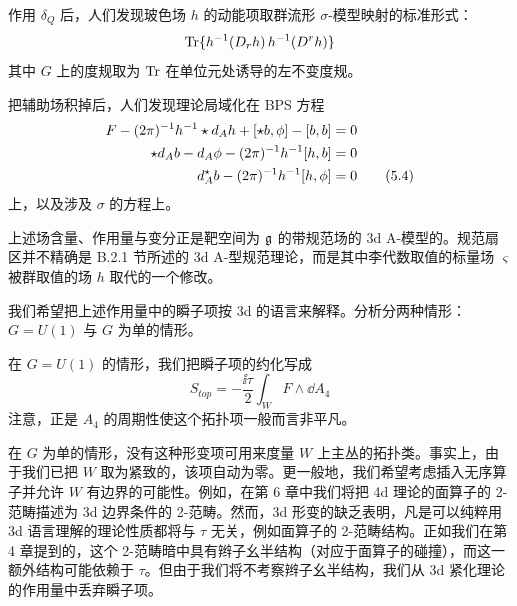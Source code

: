 作用 $\delta_Q$ 后，人们发现玻色场 $h$ 的动能项取群流形 $\sigma$-模型映射的标准形式：
\[
    \operatorname{Tr}\{h^{-1}(D_rh)\, h^{-1}(D^rh)\}
\]
其中 $G$ 上的度规取为 $\operatorname{Tr}$ 在单位元处诱导的左不变度规。

把辅助场积掉后，人们发现理论局域化在 BPS 方程
\begin{align}
    F - (2\pi)^{-1}h^{-1}\star d_Ah + [\star b,\phi] - [b,b] &= 0 \notag\\
    \star d_Ab - d_A\phi - (2\pi)^{-1}h^{-1}[h,b] &= 0 \notag\\
    d_A^\star b - (2\pi)^{-1}h^{-1}[h,\phi] &= 0 \tag{5.4}
\end{align}
上，以及涉及 $\sigma$ 的方程上。

上述场含量、作用量与变分正是靶空间为 $\mathfrak{g}$ 的带规范场的 3d A-模型的。规范扇区并不精确是 B.2.1 节所述的 3d A-型规范理论，而是其中李代数取值的标量场 $\varsigma$ 被群取值的场 $h$ 取代的一个修改。


我们希望把上述作用量中的瞬子项按 3d 的语言来解释。分析分两种情形：$G=U(1)$ 与 $G$ 为单的情形。

在 $G=U(1)$ 的情形，我们把瞬子项的约化写成
\begin{equation}
    S_{top} = -\frac{\ii\tau}{2}\int_W F\wedge \dd A_4 \tag{5.5}
\end{equation}
注意，正是 $A_4$ 的周期性使这个拓扑项一般而言非平凡。


在 $G$ 为单的情形，没有这种形变项可用来度量 $W$ 上主丛的拓扑类。事实上，由于我们已把 $W$ 取为紧致的，该项自动为零。更一般地，我们希望考虑插入无序算子并允许 $W$ 有边界的可能性。例如，在第 6 章中我们将把 4d 理论的面算子的 2-范畴描述为 3d 边界条件的 2-范畴。然而，3d 形变的缺乏表明，凡是可以纯粹用 3d 语言理解的理论性质都将与 $\tau$ 无关，例如面算子的 2-范畴结构。正如我们在第 4 章提到的，这个 2-范畴暗中具有辫子幺半结构（对应于面算子的碰撞），而这一额外结构可能依赖于 $\tau$。但由于我们将不考察辫子幺半结构，我们从 3d 紧化理论的作用量中丢弃瞬子项。


